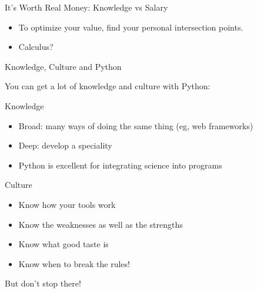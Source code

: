 \documentclass{beamer}
\begin{document}
\begin{frame}{It's Worth Real Money: Knowledge vs Salary}

  \begin{center}
  \end{center}

\begin{itemize}
\item To optimize your value, find your personal intersection points.
\item Calculus?
\end{itemize}

\end{frame}

\begin{frame}{Knowledge, Culture and Python}

You can get a lot of knowledge and culture with Python:

\vskip 0.5cm

Knowledge
\begin{itemize}
\item Broad: many ways of doing the same thing (eg, web frameworks)
\item Deep: develop a speciality
\item Python is excellent for \alert{integrating science into programs}
\end{itemize}

Culture
\begin{itemize}
\item Know \alert{how} your tools work
\item Know the \alert{weaknesses} as well as the strengths
\item Know what \alert{good taste} is
\item Know when to break the rules!
\end{itemize}

\vskip 0.5cm

But don't stop there!

\end{frame}

\end{document}
